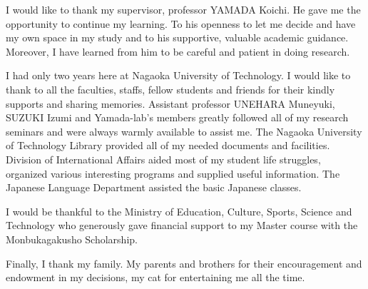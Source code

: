 I would like to thank my supervisor, professor YAMADA Koichi. He gave me the opportunity to continue my learning. To his openness to let me decide and have my own space in my study and to his supportive, valuable academic guidance. Moreover, I have learned from him to be careful and patient in doing research.

I had only two years here at Nagaoka University of Technology. I would like to thank to all the faculties, staffs, fellow students and friends for their kindly supports and sharing memories. Assistant professor UNEHARA Muneyuki, SUZUKI Izumi and Yamada-lab's members greatly followed all of my research seminars and were always warmly available to assist me. The Nagaoka University of Technology Library provided all of my needed documents and facilities. Division of International Affairs aided most of my student life struggles, organized various interesting programs and supplied useful information. The Japanese Language Department assisted the basic Japanese classes. 

I would be thankful to the Ministry of Education, Culture, Sports, Science and Technology who generously gave financial support to my Master course with the Monbukagakusho Scholarship.

Finally, I thank my family. My parents and brothers for their encouragement and endowment in my decisions, my cat for entertaining me all the time.